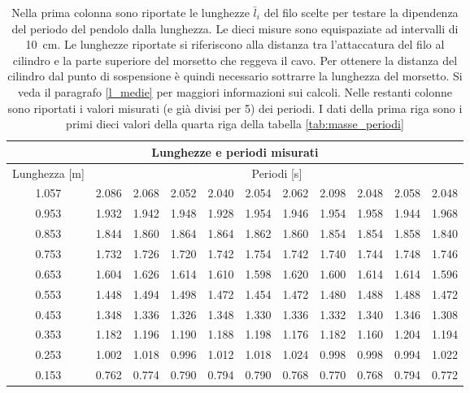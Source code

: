 \begin{table}[b!]
    \centering
    \begin{tabular}{c c c c c c c c c c c}
        \multicolumn{11}{c}{\textbf{Lunghezze e periodi misurati}} \\
        \toprule
        Lunghezza [m] & \multicolumn{10}{c}{Periodi [s]} \\
        \midrule
        1.057 & 2.086 & 2.068 & 2.052 & 2.040 & 2.054 & 2.062 & 2.098 & 2.048 & 2.058 & 2.048 \\
        0.953 & 1.932 & 1.942 & 1.948 & 1.928 & 1.954 & 1.946 & 1.954 & 1.958 & 1.944 & 1.968 \\
        0.853 & 1.844 & 1.860 & 1.864 & 1.864 & 1.862 & 1.860 & 1.854 & 1.854 & 1.858 & 1.840 \\
        0.753 & 1.732 & 1.726 & 1.720 & 1.742 & 1.754 & 1.742 & 1.740 & 1.744 & 1.748 & 1.746 \\
        0.653 & 1.604 & 1.626 & 1.614 & 1.610 & 1.598 & 1.620 & 1.600 & 1.614 & 1.614 & 1.596 \\
        0.553 & 1.448 & 1.494 & 1.498 & 1.472 & 1.454 & 1.472 & 1.480 & 1.488 & 1.488 & 1.472 \\
        0.453 & 1.348 & 1.336 & 1.326 & 1.348 & 1.330 & 1.336 & 1.332 & 1.340 & 1.346 & 1.308 \\
        0.353 & 1.182 & 1.196 & 1.190 & 1.188 & 1.198 & 1.176 & 1.182 & 1.160 & 1.204 & 1.194 \\
        0.253 & 1.002 & 1.018 & 0.996 & 1.012 & 1.018 & 1.024 & 0.998 & 0.998 & 0.994 & 1.022 \\
        0.153 & 0.762 & 0.774 & 0.790 & 0.794 & 0.790 & 0.768 & 0.770 & 0.768 & 0.794 & 0.772 \\
        \bottomrule
    \end{tabular}
    \caption{Nella prima colonna sono riportate le lunghezze $\bar{l}_i$ del filo scelte per testare la dipendenza del periodo
        del pendolo dalla lunghezza. Le dieci misure sono equispaziate ad intervalli di \SI{10}{\centi\metre}.
        Le lunghezze riportate si riferiscono alla distanza tra l'attaccatura del filo al cilindro e la parte superiore
        del morsetto che reggeva il cavo. Per ottenere la distanza del cilindro dal punto di sospensione è quindi
        necessario sottrarre la lunghezza del morsetto. Si veda il paragrafo \ref{l_medie} per maggiori informazioni sui calcoli.
        Nelle restanti colonne sono riportati i valori misurati (e già divisi per 5) dei periodi. I dati della prima riga sono i primi
        dieci valori della quarta riga della tabella \ref{tab:masse_periodi}}
    \label{tab:lunghezze_periodi}
\end{table}
